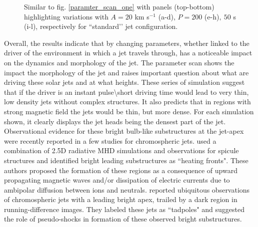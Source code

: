 \documentclass[12pt]{ociamthesis}
\newcommand{\fref}[1]{fig. \ref{#1}}
\begin{document}
\begin{figure}
\captionsetup[subfigure]{labelformat=empty}
\centering
{} 
\caption{Similar to \fref{paramter_scan_one} with panels (top-bottom) highlighting variations with $A = 20$ km s$^{-1}$ (a-d), $P = 200$ (e-h)$,~50$ s (i-l), respectively for ``standard’’ jet configuration.}
\label{paramter_scan_two}
\end{figure}
Overall, the results indicate that by changing parameters, whether linked to the driver of the environment in which a jet travels through, has a noticeable impact on the dynamics and morphology of the jet. The parameter scan shows the impact the morphology of the jet and raises important question about what are driving these solar jets and at what heights. These series of simulation suggest that if the driver is an instant pulse\textbackslash short driving time would lead to very thin, low density jets without complex structures. It also predicts that in regions with strong magnetic field the jets would be thin, but more dense. For each simulation shown, it clearly displays the jet heads being the densest part of the jet. Observational evidence for these bright bulb-like substructures at the jet-apex were recently reported in a few studies \citep{depontieu2017, srivastava2018NatAs} for chromospheric jets. \citet{depontieu2017} used a combination of 2.5D radiative MHD simulations and observations for spicule structures and identified bright  leading substructures as ``heating fronts". These authors proposed the formation of these regions as a consequence of upward propagating magnetic waves and/or dissipation of electric currents due to ambipolar diffusion between ions and neutrals. \citet{srivastava2018NatAs} reported ubiquitous observations of chromospheric jets with a leading bright apex, trailed by a dark region in running-difference images. They labeled these jets as ``tadpoles" and suggested the role of pseudo-shocks in formation of these observed bright substructures.
\end{document}
